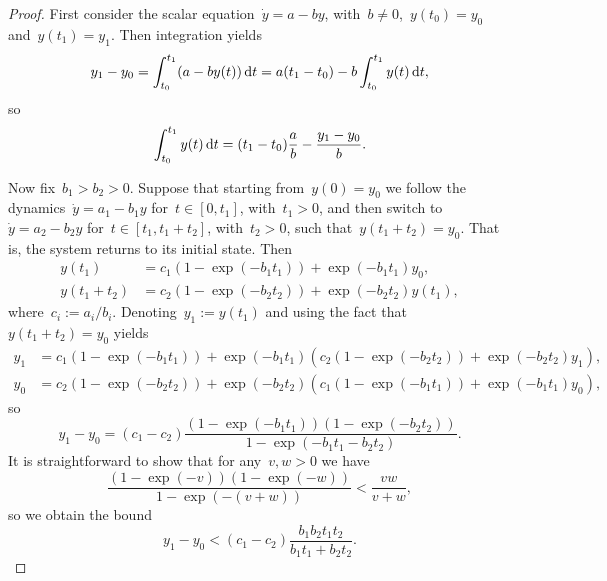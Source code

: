 \begin{proof}
	First consider the scalar equation~$\dot y=a -by$, with~$b\not =0$,~$y(t_0)=y_0$ and~$y(t_1)=y_1$. 
	Then integration yields
	\begin{equation}
		y_1-y_0=\int_{t_0}^{t_1} (a-by(t))\mathop{}\!\mathrm{d} t=
		a(t_1-t_0)-b \int_{t_0}^{t_1} y(t) \mathop{}\!\mathrm{d} t, 
	\end{equation}
	so
	\begin{equation} \label{eq:scalary}
	\int_{t_0}^{t_1} y(t) \mathop{}\!\mathrm{d} t= (t_1-t_0)\frac{a}{b}-\frac{y_1-y_0}{b}. 
	\end{equation}
	
	Now fix~$b_1>b_2>0$.
	Suppose that starting  from~$y(0)=y_0$ we follow the dynamics~$\dot y=a_1  -b_1  y$ for~$t\in[0,t_1]$, with~$t_1>0$,   
	and then switch to~$\dot y=a_2   -b_2  y$ for~$t\in [t_1,t_1+t_2]$, with~$t_2>0$, 
	such that~$y(t_1+t_2)=y_0$.  
	That is, the system returns to its initial state.
	Then
	\begin{subequations}
		\begin{align} 
			y(t_1)&= c_1(1-\exp(-b_1 t_1) )+ \exp(-b_1 t_1)y_0    ,\\
			y(t_1+t_2)  &=c_2 (1-\exp(-b_2 t_2) )+ \exp(-b_2 t_2)y(t_1) , 
		\end{align}
	\end{subequations}
	where~$c_i:=a_i/b_i$. 
	Denoting~$y_1:=y(t_1)$ and using the fact that~$	y(t_1+t_2)=y_0$ yields 
	\begin{subequations}
		\begin{align} 
			y_1&= c_1(1-\exp(-b_1 t_1) )+ \exp(-b_1 t_1) \left(  c_2 (1-\exp(-b_2 t_2) )+ \exp(-b_2 t_2)y_1  \right)     ,\\
			y_0  &=c_2 (1-\exp(-b_2 t_2) )+ \exp(-b_2 t_2) \left ( 
			c_1(1-\exp(-b_1 t_1) )+ \exp(-b_1 t_1)y_0
			\right)  , 
		\end{align}
	\end{subequations}
	so
	\begin{equation}
	y_1-y_0= (c_1-c_2) \frac{(1-\exp(-b_1 t_1 ) )(1-\exp(-b_2 t_2 ) )   }{1-\exp(-b_1 t_1-b_2 t_2  ) } .
	\end{equation}
	It is straightforward to show that for any~$v,w>0$ we have
	\begin{equation}
	\frac{(1-\exp(-v))(1-\exp(-w))}{1-\exp(-(v+w))} <\frac{vw}{v+w},
	\end{equation}
	so we obtain the bound
	\begin{equation} \label{eq:bosdcu}
	y_1-y_0<  (c_1-c_2) \frac{ b_1 b_2 t_1 t_2   }
	{ b_1 t_1 + b_2 t_2  } .
	\end{equation}
	

\end{proof}
